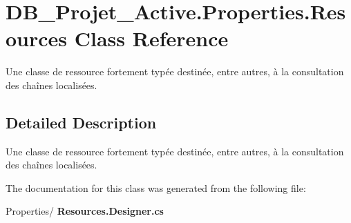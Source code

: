 \section{D\+B\+\_\+\+Projet\+\_\+\+Active.\+Properties.\+Resources Class Reference}
\label{class_d_b___projet___active_1_1_properties_1_1_resources}


Une classe de ressource fortement typée destinée, entre autres, à la consultation des chaînes localisées.  




\subsection{Detailed Description}
Une classe de ressource fortement typée destinée, entre autres, à la consultation des chaînes localisées. 



The documentation for this class was generated from the following file\+:\begin{DoxyCompactItemize}
\item 
Properties/\textbf{ Resources.\+Designer.\+cs}\end{DoxyCompactItemize}
